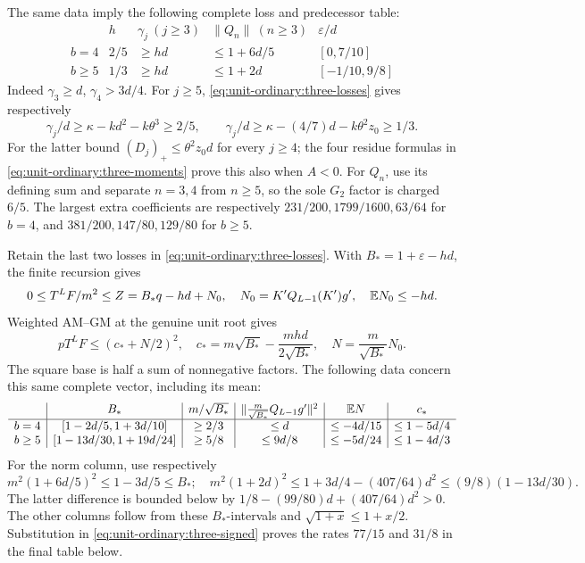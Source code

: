The same data imply the following complete loss and predecessor table:
\begin{equation}\label{eq:unit-ordinary:three-long-data}
\begin{array}{c|c|c|c|c}
 &h&\gamma_j\ (j\ge3)&\|Q_n\|\ (n\ge3)&\varepsilon/d\\\hline
 b=4&2/5&\ge hd&\le1+6d/5&[0,7/10]\\
 b\ge5&1/3&\ge hd&\le1+2d&[-1/10,9/8]
\end{array}
\end{equation}
Indeed \(\gamma_3\ge d\), \(\gamma_4>3d/4\).
For \(j\ge5\), \eqref{eq:unit-ordinary:three-losses} gives respectively
\[
 \gamma_j/d\ge\kappa-kd^2-k\theta^3\ge2/5,
 \qquad\gamma_j/d\ge\kappa-(4/7)d-k\theta^2z_0\ge1/3.
\]
For the latter bound \((D_j)_+\le\theta^2z_0d\) for every
\(j\ge4\); the four residue formulas in
\eqref{eq:unit-ordinary:three-moments} prove this also when \(A<0\).
For \(Q_n\), use its defining sum and separate \(n=3,4\) from
\(n\ge5\), so the sole \(G_2\) factor is charged \(6/5\).
The largest extra coefficients are respectively
\(231/200,1799/1600,63/64\) for \(b=4\), and
\(381/200,147/80,129/80\) for \(b\ge5\).

Retain the last two losses in
\eqref{eq:unit-ordinary:three-losses}. With \(B_*=1+\varepsilon-hd\),
the finite recursion gives
\[
 0\le T^LF/m^2\le Z=B_*q-hd+N_0,
 \quad N_0=K'Q_{L-1}(K')g',\quad \mathbb E N_0\le-hd.
\]
Weighted AM--GM at the genuine unit root gives
\[
 pT^LF\le(c_*+N/2)^2,\quad
 c_*=m\sqrt{B_*}-\frac{mhd}{2\sqrt{B_*}},\quad
 N=\frac m{\sqrt{B_*}}N_0.
\]
The square base is half a sum of nonnegative factors. The following
data concern this same complete vector, including its mean:
\begin{equation}\label{eq:unit-ordinary:three-long-payments}
\begin{array}{c|c|c|c|c|c}
 &B_*&m/\sqrt{B_*}&\|\frac m{\sqrt{B_*}}Q_{L-1}g'\|^2
 &\mathbb E N&c_*\\\hline
 b=4&[1-2d/5,1+3d/10]&\ge2/3&\le d&\le-4d/15&\le1-5d/4\\
 b\ge5&[1-13d/30,1+19d/24]&\ge5/8&\le9d/8&\le-5d/24&\le1-4d/3
\end{array}
\end{equation}
For the norm column, use respectively
\[
 m^2(1+6d/5)^2\le1-3d/5\le B_*;
 \quad m^2(1+2d)^2\le1+3d/4-(407/64)d^2
                  \le(9/8)(1-13d/30).
\]
The latter difference is bounded below by
\(1/8-(99/80)d+(407/64)d^2>0\).
The other columns follow from these \(B_*\)-intervals and
\(\sqrt{1+x}\le1+x/2\).
Substitution in \eqref{eq:unit-ordinary:three-signed} proves the
rates \(77/15\) and \(31/8\) in the final table below.

